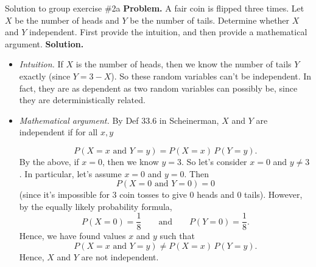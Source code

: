 \documentclass[10pt]{beamer}
\begin{document}
\begin{frame}{Solution to group exercise \#2a}
\footnotesize 
\textbf{Problem.}  A fair coin is flipped three times. Let $X$ be the number of heads and $Y$ be the number of tails. Determine whether $X$ and $Y$ independent. First provide the intuition, and then provide a mathematical argument.  
\vfill 
\vspace{-.2cm}
\textbf{Solution.}
\vspace{-.2cm}
\begin{itemize}
\item \textit{Intuition.} If $X$ is the number of heads, then we \alert{know} the number of tails $Y$ \alert{exactly} (since $Y=3-X$).  So these random variables can't be independent. In fact, they are as dependent as two random variables can possibly be, since they are deterministically related.
\vfill 
\item \textit{Mathematical argument.} By Def 33.6 in Scheinerman, $X$ and $Y$ are independent if for all $x,y$

\[P(X=x \text{ and } Y=y) = P(X=x) \, P(Y=y). \]
By the above, if $x=0$, then we know $y=3$.  So let's consider $x=0$ and $y \neq 3$. In particular, let's assume $x=0$ and $y=0$.  Then 
\[ P(X=0 \text{ and } Y=0) = 0 \]
(since it's impossible for 3 coin tosses to give 0 heads and 0 tails).  However, by the equally likely probability formula,
\[P(X=0) = \frac{1}{8} \qquad \text{and} \qquad  P(Y=0) = \frac{1}{8}.\]
Hence, we have found values $x$ and $y$ such that
\[P(X=x \text{ and } Y=y) \neq P(X=x) \, P(Y=y). \]
Hence, $X$ and $Y$ are not independent.

\end{itemize}

\end{frame}
\end{document}
